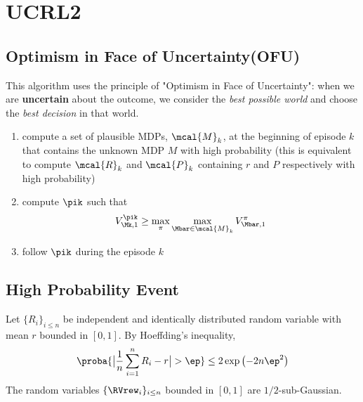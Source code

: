     \section{UCRL2}
    \label{sec:ucrl2}
    
        \subsection{Optimism in Face of Uncertainty(OFU)}
        \label{subsec:OFU}
        
            This algorithm uses the principle of "Optimism in Face of Uncertainty": when we are \textbf{uncertain} about the outcome, we consider the \textit{best possible world} and choose the \textit{best decision} in that world.
            
            \begin{enumerate}
                \item compute a set of plausible MDPs, $\mcal{M}_k$, at the beginning of episode $k$ that contains the unknown MDP $M$ with high probability (this is equivalent to compute $\mcal{R}_k$ and $\mcal{P}_k$ containing $r$ and $P$ respectively with high probability)
                \item compute $\pik$ such that
                    \begin{align}
                    V_{\Mk,1}^{\pik} \ge \max_{\pi}\max_{\Mbar\in\mcal{M}_k} V_{\Mbar,1}^\pi
                    \end{align}
                \item follow $\pik$ during the episode $k$
            \end{enumerate}
        
        \subsection{High Probability Event}
        \label{subsec:high_prob_event}
        
            \begin{thm}
                \label{thm:hoeffding}
                Let $\{R_i\}_{i\le n}$ be independent and identically distributed random variable with mean $r$ bounded in $[0,1]$.
                By Hoeffding's inequality,
                \begin{align*}
                    \proba{\big\vert\frac{1}{n}\sum_{i=1}^nR_i-r\big\vert>\ep}\le2\exp\left(-2n\ep^2\right)
                \end{align*}
                The random variables $\{\RVrew_i\}_{i\le n}$ bounded in $[0,1]$ are $1/2$-sub-Gaussian.
            \end{thm}
            
